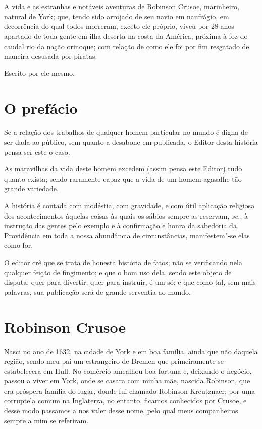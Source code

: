 \chapter*{}
\thispagestyle{empty}


\vfill
A vida e as estranhas e notáveis aventuras de Robinson Crusoe,
marinheiro, natural de York; que, tendo sido arrojado de seu navio em
naufrágio, em decorrência do qual todos morreram, exceto ele próprio,
viveu por 28 anos apartado de toda gente em ilha deserta na costa da
América, próxima à foz do caudal rio da nação orinoque; com relação de
como ele foi por fim resgatado de maneira desusada por piratas.

\hfill{}Escrito por ele mesmo.

\chapter{O prefácio}

Se a relação dos trabalhos de qualquer homem particular no mundo é digna
de ser dada ao público, sem quanto a desabone em publicada, o Editor
desta história pensa ser este o caso.

As maravilhas da vida deste homem excedem (assim pensa este Editor) tudo
quanto exista; sendo raramente capaz que a vida de um homem agasalhe tão
grande variedade.

A história é contada com modéstia, com gravidade, e com útil aplicação
religiosa dos acontecimentos àquelas coisas às quais os sábios sempre as
reservam, \emph{sc.}, à instrução das gentes pelo exemplo e à
confirmação e honra da sabedoria da Providência em toda a nossa
abundância de circunstâncias, manifestem"-se elas como for.

O editor crê que se trata de honesta história de fatos; não se
verificando nela qualquer feição de fingimento; e que o bom uso dela,
sendo este objeto de disputa, quer para divertir, quer para instruir, é
um só; e que como tal, sem mais palavras, sua publicação será de grande
serventia ao mundo.

\asterisc

\chapter{Robinson Crusoe}

Nasci no ano de 1632, na cidade de York e em boa família, ainda que não
daquela região, sendo meu pai um estrangeiro de Bremen que primeiramente
se estabelecera em Hull. No comércio amealhou boa fortuna e, deixando o
negócio, passou a viver em York, onde se casara com minha mãe, nascida
Robinson, que era próspera família do lugar, donde fui chamado Robinson
Kreutznaer; por uma corruptela comum na Inglaterra, no entanto, ficamos
conhecidos por Crusoe, e desse modo passamos a nos valer desse nome,
pelo qual meus companheiros sempre a mim se referiram.

